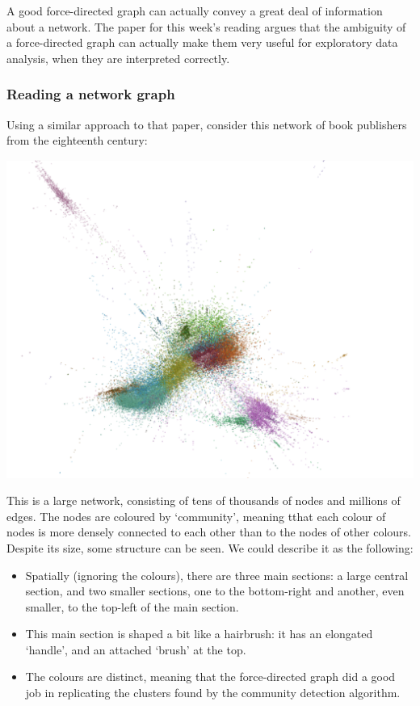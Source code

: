 \documentclass[
]{book}
\begin{document}
A good force-directed graph can actually convey a great deal of information about a network. The paper for this week's reading argues that the ambiguity of a force-directed graph can actually make them very useful for exploratory data analysis, when they are interpreted correctly.

\hypertarget{reading-a-network-graph}{%
\subsubsection{Reading a network graph}\label{reading-a-network-graph}}

Using a similar approach to that paper, consider this network of book publishers from the eighteenth century:

\includegraphics{images/full_net.png}

This is a large network, consisting of tens of thousands of nodes and millions of edges. The nodes are coloured by `community', meaning tthat each colour of nodes is more densely connected to each other than to the nodes of other colours. Despite its size, some structure can be seen. We could describe it as the following:

\begin{itemize}
\item
  Spatially (ignoring the colours), there are three main sections: a large central section, and two smaller sections, one to the bottom-right and another, even smaller, to the top-left of the main section.
\item
  This main section is shaped a bit like a hairbrush: it has an elongated `handle', and an attached `brush' at the top.
\item
  The colours are distinct, meaning that the force-directed graph did a good job in replicating the clusters found by the community detection algorithm.
\end{itemize}
\end{document}
